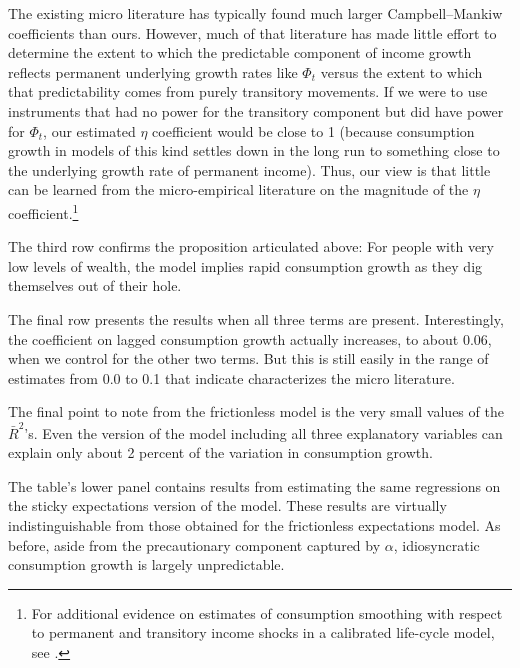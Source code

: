 \documentclass[titlepage]{\econtex}\newcommand{\texname}{cAndCwithStickyE}
\begin{document}
The existing micro literature has typically found much larger Campbell--Mankiw coefficients than ours.  However, much of that literature has made little effort to determine the extent to which the predictable component of income growth reflects permanent underlying growth rates like $\Phi_{t}$ versus the extent to which that predictability comes from purely transitory movements.  If we were to use instruments that had no power for the transitory component but did have power for $\Phi_{t}$, our estimated $\eta$ coefficient would be close to 1 (because consumption growth in models of this kind settles down in the long run to something close to the underlying growth rate of permanent income).  Thus, our view is that little can be learned from the micro-empirical literature on the magnitude of the $\eta$ coefficient.\footnote{For additional evidence on estimates of consumption smoothing with respect to permanent and transitory income shocks in a calibrated life-cycle model, see \cite{kaplanViolante:aejMacro}.}

The third row confirms the proposition articulated above: For people with very low levels of wealth, the model implies rapid consumption growth as they dig themselves out of their hole.

The final row presents the results when all three terms are present.  Interestingly, the coefficient on lagged consumption growth actually increases, to about 0.06, when we control for the other two terms.  But this is still easily in the range of estimates from 0.0 to 0.1 that \cite{hrsHabit} indicate characterizes the micro literature.

The final point to note from the frictionless model is the very small values of the $\bar{R}^{2}$'s.  Even the version of the model including all three explanatory variables can explain only about 2 percent of the variation in consumption growth.

The table's lower panel contains results from estimating the same regressions on the sticky expectations version of the model.  These results are virtually indistinguishable from those obtained for the frictionless expectations model.  As before, aside from the precautionary component captured by $\alpha$, idiosyncratic consumption growth is largely unpredictable.
\end{document}
